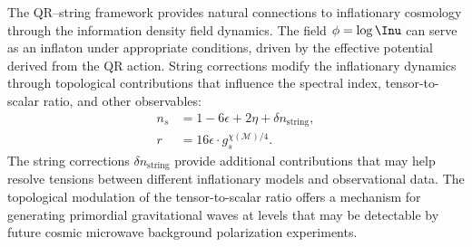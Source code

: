 The QR–string framework provides natural connections to inflationary cosmology through the information density field dynamics. The field $\phi = \log \Inu$ can serve as an inflaton under appropriate conditions, driven by the effective potential derived from the QR action. String corrections modify the inflationary dynamics through topological contributions that influence the spectral index, tensor-to-scalar ratio, and other observables:
\begin{align}
n_s &= 1 - 6\epsilon + 2\eta + \delta n_{\text{string}}, \\
r   &= 16\epsilon \cdot g_s^{\chi(\mathcal{M})/4}.
\label{eq:inflationary-parameters}
\end{align}
The string corrections $\delta n_{\text{string}}$ provide additional contributions that may help resolve tensions between different inflationary models and observational data. The topological modulation of the tensor-to-scalar ratio offers a mechanism for generating primordial gravitational waves at levels that may be detectable by future cosmic microwave background polarization experiments.